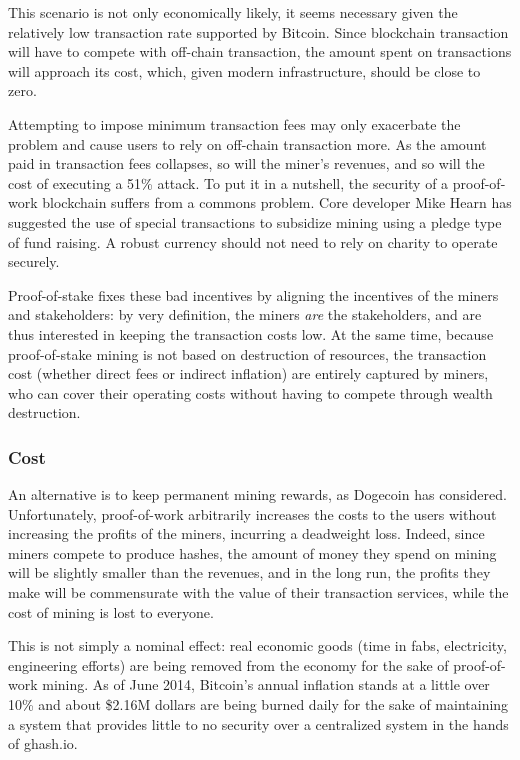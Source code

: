 \documentclass[letterpaper]{article}
\begin{document}
This scenario is not only economically likely, it seems necessary given the
relatively low transaction rate supported by Bitcoin. Since blockchain
transaction will have to compete with off-chain transaction, the amount spent on
transactions will approach its cost, which, given modern infrastructure, should
be close to zero.

Attempting to impose minimum transaction fees may only exacerbate the problem
and cause users to rely on off-chain transaction more. As the amount paid in
transaction fees collapses, so will the miner's revenues, and so will the cost
of executing a 51\% attack. To put it in a nutshell, the security of a
proof-of-work blockchain suffers from a commons problem\cite{btccommons}.
Core developer Mike Hearn has suggested the use of special transactions to
subsidize mining using a pledge type of fund raising\cite{dominantassurance}.
A robust currency should not need to rely on charity to operate securely.

Proof-of-stake fixes these bad incentives by aligning the incentives of the
miners and stakeholders: by very definition, the miners \emph{are} the
stakeholders, and are thus interested in keeping the transaction costs low.
At the same time, because proof-of-stake mining is not based on destruction of
resources, the transaction cost (whether direct fees or indirect inflation)
are entirely captured by miners, who can cover their operating costs
without having to compete through wealth destruction.

\subsubsection{Cost}
An alternative is to keep permanent mining rewards, as Dogecoin\cite{doge} has
considered. Unfortunately, proof-of-work arbitrarily increases the costs to the
users without increasing the profits of the miners, incurring a deadweight loss.
Indeed, since miners compete to produce hashes, the amount of money they spend
on mining will be slightly smaller than the revenues, and in the long run,
the profits they make will be commensurate with the value of their transaction
services, while the cost of mining is lost to everyone.

This is not simply a nominal effect: real economic goods (time in fabs,
electricity, engineering efforts) are being removed from the economy for the
sake of proof-of-work mining. As of June 2014, Bitcoin's annual inflation stands
at a little over 10\% and about \$2.16M dollars are being burned daily for the
sake of maintaining a system that provides little to no security over a
centralized system in the hands of ghash.io.
\end{document}
